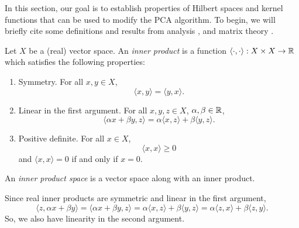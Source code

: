 

In this section, our goal is to establish properties of Hilbert spaces and kernel functions that can be used to modify the PCA algorithm.
To begin, we will briefly cite some definitions and results from analysis \cite{kreyszig1991introductory}, \cite{rudin1987real} and matrix theory \cite{horn2013matrix}.

\begin{definition}
    \cite{small1994hilbert} %
    Let \(X\) be a (real) vector space.
    An \textit{inner product} is a function \(\langle \cdot, \cdot \rangle : X \times X \to \mathbb{R}\) which satisfies the following properties:
    \begin{enumerate}
        \item Symmetry. For all \(x,y \in X\),
        \[\langle x,y \rangle = \langle y, x \rangle.\]
        \item Linear in the first argument. For all \(x,y,z \in X\), \(\alpha, \beta \in \mathbb{R}\),
        \[\langle \alpha x + \beta y, z \rangle = \alpha \langle x, z \rangle + \beta \langle y, z \rangle.\]
        \item Positive definite. For all \(x \in X\),
        \[\langle x, x \rangle \geq 0\]
        and \(\langle x, x \rangle = 0\) if and only if \(x = 0\).
    \end{enumerate}
    An \textit{inner product space} is a vector space along with an inner product.
\end{definition}

Since real inner products are symmetric and linear in the first argument,
\[
    \langle z, \alpha x + \beta y\rangle
    = \langle \alpha x + \beta y, z \rangle
    = \alpha \langle x, z \rangle + \beta \langle y, z \rangle
    = \alpha \langle z, x \rangle + \beta \langle z, y \rangle
.\]
So, we also have linearity in the second argument.

